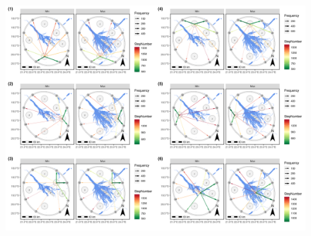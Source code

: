 \documentclass[abstract=on,10pt,a4paper,bibliography=totocnumbered]{article}
\begin{document}
\begin{figure}[htbp]
  \begin{center}
  \includegraphics[width = \textwidth]{99_IPCBuffer.png}
  \caption{}
  \label{IPCBuffer}
  \end{center}
\end{figure}


\newpage
\begingroup
\singlespacing

\endgroup
\end{document}
